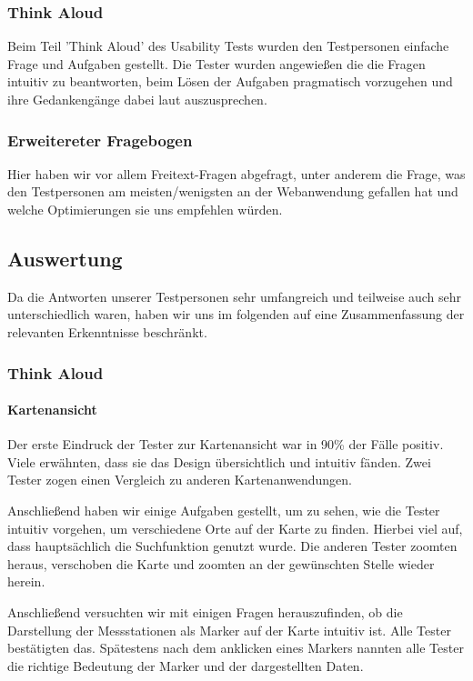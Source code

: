     \subsubsection*{Think Aloud}
      Beim Teil 'Think Aloud' des Usability Tests wurden den Testpersonen einfache Frage und Aufgaben gestellt. Die Tester wurden angewießen die die Fragen intuitiv zu beantworten, beim Lösen der Aufgaben pragmatisch vorzugehen und ihre Gedankengänge dabei laut auszusprechen.
    
    \subsubsection*{Erweitereter Fragebogen}
      Hier haben wir vor allem Freitext-Fragen abgefragt, unter anderem die Frage, was den Testpersonen am meisten/wenigsten an der Webanwendung gefallen hat und welche Optimierungen sie uns empfehlen würden.

  \subsection{Auswertung}
    Da die Antworten unserer Testpersonen sehr umfangreich und teilweise auch sehr unterschiedlich waren, haben wir uns im folgenden auf eine Zusammenfassung der relevanten Erkenntnisse beschränkt.

    \subsubsection{Think Aloud}
      \paragraph{Kartenansicht}
        Der erste Eindruck der Tester zur Kartenansicht war in 90\% der Fälle positiv. Viele erwähnten, dass sie das Design übersichtlich und intuitiv fänden. Zwei Tester zogen einen Vergleich zu anderen Kartenanwendungen.

        Anschließend haben wir einige Aufgaben gestellt, um zu sehen, wie die Tester intuitiv vorgehen, um verschiedene Orte auf der Karte zu finden. Hierbei viel auf, dass hauptsächlich die Suchfunktion genutzt wurde. Die anderen Tester zoomten heraus, verschoben die Karte und zoomten an der gewünschten Stelle wieder herein.

        Anschließend versuchten wir mit einigen Fragen herauszufinden, ob die Darstellung der Messstationen als Marker auf der Karte intuitiv ist. Alle Tester bestätigten das. Spätestens nach dem anklicken eines Markers nannten alle Tester die richtige Bedeutung der Marker und der dargestellten Daten.

